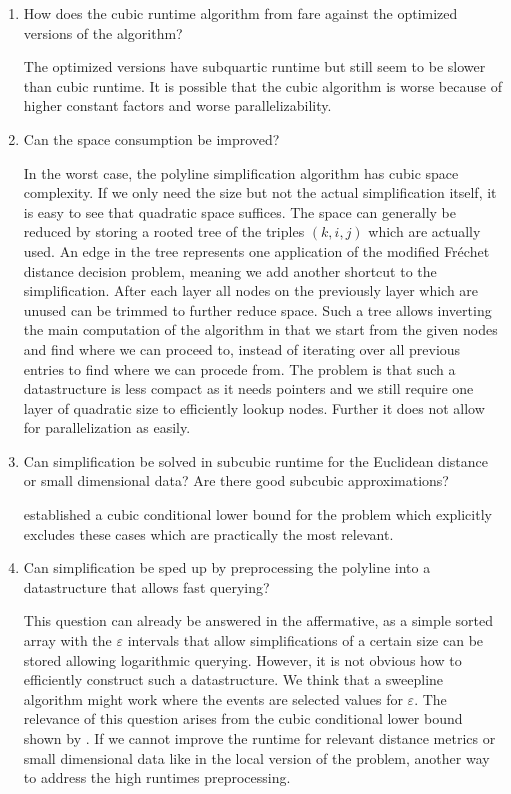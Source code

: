 \begin{enumerate}
  \item How does the cubic runtime algorithm from \citeauthor{polyline_simplification_has_cubic_complexity_bringmannetal} fare against the optimized versions of the \citeauthor{on_optimal_polyline_simplification_using_the_hausdorff_and_frechet_distance} algorithm? 

    The optimized versions have subquartic runtime but still seem to be slower than cubic runtime. It is possible that the cubic algorithm is worse because of higher constant factors and worse parallelizability. 

  \item Can the space consumption be improved? 

  In the worst case, the polyline simplification algorithm has cubic space complexity. If we only need the size but not the actual simplification itself, it is easy to see that quadratic space suffices. The space can generally be reduced by storing a rooted tree of the triples \((k, i, j)\) which are actually used. An edge in the tree represents one application of the modified Fréchet distance decision problem, meaning we add another shortcut to the simplification. After each layer all nodes on the previously layer which are unused can be trimmed to further reduce space. Such a tree allows inverting the main computation of the algorithm in that we start from the given nodes and find where we can proceed to, instead of iterating over all previous entries to find where we can procede from. The problem is that such a datastructure is less compact as it needs pointers and we still require one layer of quadratic size to efficiently lookup nodes. Further it does not allow for parallelization as easily. 

\item Can simplification be solved in subcubic runtime for the Euclidean distance or small dimensional data? Are there good subcubic approximations?

  \citeauthor{polyline_simplification_has_cubic_complexity_bringmannetal} established a cubic conditional lower bound for the problem which explicitly excludes these cases which are practically the most relevant.

  \item Can simplification be sped up by preprocessing the polyline into a datastructure that allows fast querying?
  
	  This question can already be answered in the affermative, as a simple sorted array with the \(\varepsilon\) intervals that allow simplifications of a certain size can be stored allowing logarithmic querying. However, it is not obvious how to efficiently construct such a datastructure. We think that a sweepline algorithm might work where the events are selected values for \(\varepsilon\). The relevance of this question arises from the cubic conditional lower bound shown by \citeauthor{polyline_simplification_has_cubic_complexity_bringmannetal}. If we cannot improve the runtime for relevant distance metrics or small dimensional data like in the local version of the problem, another way to address the high runtimes preprocessing. 


\end{enumerate}
